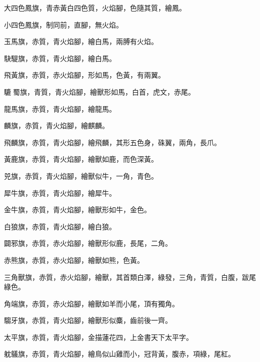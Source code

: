 \begin{pinyinscope}
 大四色鳳旗，青赤黃白四色質，火焰腳，色隨其質，繪鳳。



 小四色鳳旗，制同前，直腳，無火焰。



 玉馬旗，赤質，青火焰腳，繪白馬，兩膊有火焰。



 駃騠旗，赤質，青火焰腳，繪白馬。



 飛黃旗，赤質，赤火焰腳，形如馬，色黃，有兩翼。



 騼蜀旗，青質，青火焰腳，繪獸形如馬，白首，虎文，赤尾。



 龍馬旗，赤質，青火焰腳，繪龍馬。



 麟旗，赤質，青火焰腳，繪麒麟。



 飛麟旗，赤質，青火焰腳，繪飛麟，其形五色身，硃翼，兩角，長爪。



 黃鹿旗，赤質，青火焰腳，繪獸如鹿，而色深黃。



 兕旗，赤質，青火焰腳，繪獸似牛，一角，青色。



 犀牛旗，赤質，青火焰腳，繪犀牛。



 金牛旗，赤質，青火焰腳，繪獸形如牛，金色。



 白狼旗，赤質，青火焰腳，繪白狼。



 闢邪旗，赤質，赤火焰腳，繪獸形似鹿，長尾，二角。



 赤熊旗，赤質，赤火焰腳，繪獸如熊，色黃。



 三角獸旗，赤質，赤火焰腳，繪獸，其首類白澤，綠發，三角，青質，白腹，跋尾綠色。



 角端旗，赤質，赤火焰腳，繪獸如羊而小尾，頂有獨角。



 騶牙旗，赤質，青火焰腳，繪獸形似麋，齒前後一齊。



 太平旗，赤質，青火焰腳，金描蓮花四，上金書天下太平字。



 躭鸃旗，赤質，青火焰腳，繪鳥似山雞而小，冠背黃，腹赤，項綠，尾紅。




\end{pinyinscope}
